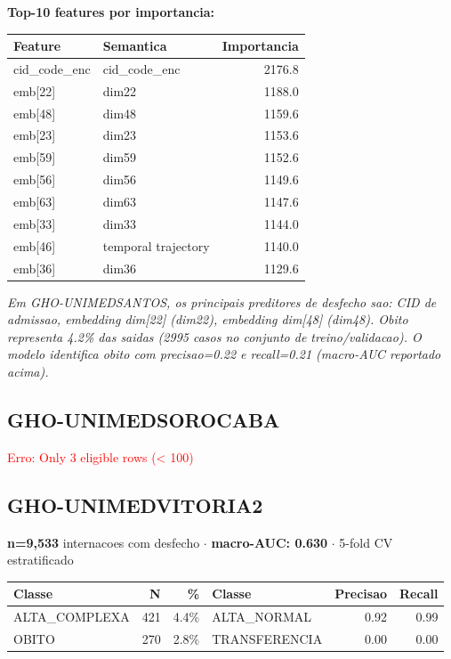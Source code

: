 \documentclass[11pt,a4paper]{article}
\begin{document}
\vspace{4pt}\noindent\textbf{Top-10 features por importancia:}

\begin{tabular}{llr}
\toprule
Feature & Semantica & Importancia \\
\midrule
cid\_code\_enc & cid\_code\_enc & 2176.8 \\
emb[22] & dim22 & 1188.0 \\
emb[48] & dim48 & 1159.6 \\
emb[23] & dim23 & 1153.6 \\
emb[59] & dim59 & 1152.6 \\
emb[56] & dim56 & 1149.6 \\
emb[63] & dim63 & 1147.6 \\
emb[33] & dim33 & 1144.0 \\
emb[46] & temporal trajectory & 1140.0 \\
emb[36] & dim36 & 1129.6 \\
\bottomrule
\end{tabular}

\vspace{4pt}\noindent\textit{Em GHO-UNIMEDSANTOS, os principais preditores de desfecho sao: CID de admissao, embedding dim[22] (dim22), embedding dim[48] (dim48). Obito representa 4.2\% das saidas (2995 casos no conjunto de treino/validacao). O modelo identifica obito com precisao=0.22 e recall=0.21 (macro-AUC reportado acima).}

\subsection{GHO-UNIMEDSOROCABA}
\textcolor{red}{Erro: Only 3 eligible rows (< 100)}

\subsection{GHO-UNIMEDVITORIA2}
\textbf{n=9,533} internacoes com desfecho $\cdot$ \textbf{macro-AUC: 0.630} $\cdot$ 5-fold CV estratificado

\begin{tabular}{lrr|lrr}
\toprule
Classe & N & \% & Classe & Precisao & Recall \\
\midrule
ALTA\_COMPLEXA & 421 & 4.4\% & ALTA\_NORMAL & 0.92 & 0.99 \\
OBITO & 270 & 2.8\% & TRANSFERENCIA & 0.00 & 0.00 \\
\bottomrule
\end{tabular}
\end{document}

